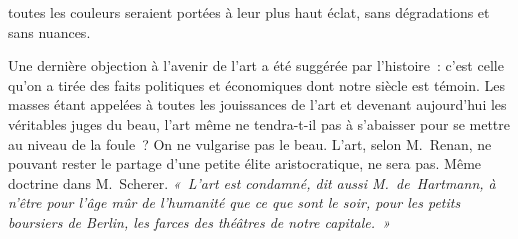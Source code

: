 \documentclass[french,twoside]{book} %
\begin{document}
toutes les couleurs seraient portées à leur plus haut éclat, sans dégradations et sans nuances.\par
\par
Une dernière objection à l’avenir de l’art a été suggérée par l’histoire : c’est celle qu’on a tirée des faits politiques et économiques dont notre siècle est témoin. Les masses étant appelées à toutes les jouissances de l’art et devenant aujourd’hui les véritables juges du beau, l’art même ne tendra-t-il pas à s’abaisser pour se mettre au niveau de la foule ? On ne vulgarise pas le beau. L’art, selon M. Renan, ne pouvant rester le partage d’une petite élite aristocratique, ne sera pas. Même doctrine dans M. Scherer. \emph{« L’art est condamné, dit aussi M. de Hartmann, à n’être pour l’âge mûr de l’humanité que ce que sont le soir, pour les petits boursiers de Berlin, les farces des théâtres de notre capitale. »}\par
\end{document}
